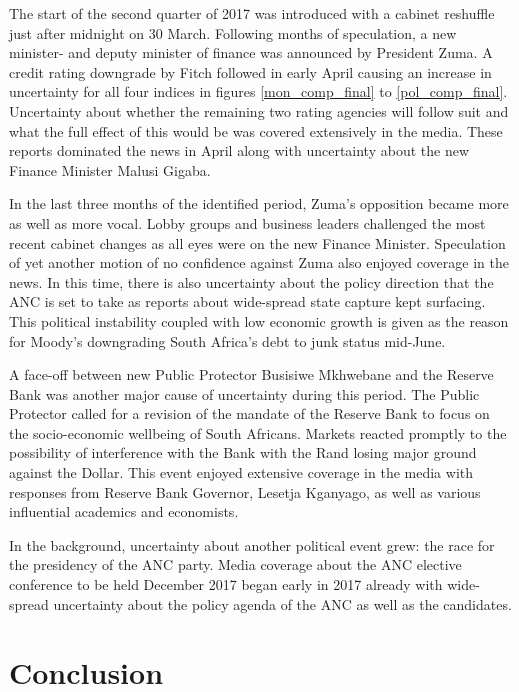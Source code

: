 \documentclass[11pt,preprint, authoryear]{elsarticle}
\numberwithin{equation}{section}
\numberwithin{figure}{section}
\numberwithin{table}{section}
\begin{document}
The start of the second quarter of 2017 was introduced with a cabinet
reshuffle just after midnight on 30 March. Following months of
speculation, a new minister- and deputy minister of finance was
announced by President Zuma. A credit rating downgrade by Fitch followed
in early April causing an increase in uncertainty for all four indices
in figures \ref{mon_comp_final} to \ref{pol_comp_final}. Uncertainty
about whether the remaining two rating agencies will follow suit and
what the full effect of this would be was covered extensively in the
media. These reports dominated the news in April along with uncertainty
about the new Finance Minister Malusi Gigaba.

In the last three months of the identified period, Zuma's opposition
became more as well as more vocal. Lobby groups and business leaders
challenged the most recent cabinet changes as all eyes were on the new
Finance Minister. Speculation of yet another motion of no confidence
against Zuma also enjoyed coverage in the news. In this time, there is
also uncertainty about the policy direction that the ANC is set to take
as reports about wide-spread state capture kept surfacing. This
political instability coupled with low economic growth is given as the
reason for Moody's downgrading South Africa's debt to junk status
mid-June.

A face-off between new Public Protector Busisiwe Mkhwebane and the
Reserve Bank was another major cause of uncertainty during this period.
The Public Protector called for a revision of the mandate of the Reserve
Bank to focus on the socio-economic wellbeing of South Africans. Markets
reacted promptly to the possibility of interference with the Bank with
the Rand losing major ground against the Dollar. This event enjoyed
extensive coverage in the media with responses from Reserve Bank
Governor, Lesetja Kganyago, as well as various influential academics and
economists.

In the background, uncertainty about another political event grew: the
race for the presidency of the ANC party. Media coverage about the ANC
elective conference to be held December 2017 began early in 2017 already
with wide-spread uncertainty about the policy agenda of the ANC as well
as the candidates.

\section{\texorpdfstring{Conclusion
\label{sec_conclude}}{Conclusion }}\label{conclusion}
\end{document}
